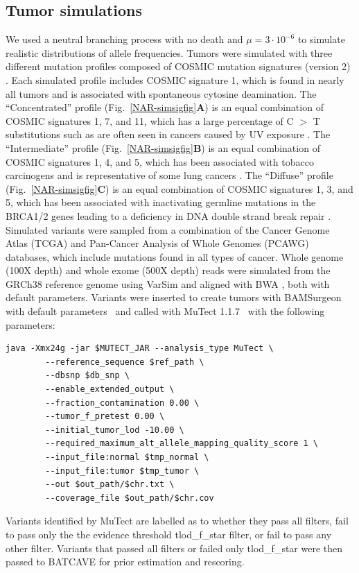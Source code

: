 \documentclass[a4,center,fleqn]{NAR}
\newcommand{\batcave}{BATCAVE }
\begin{document}
\subsection{Tumor simulations}
We used a neutral branching process with no death and $\mu=3\cdot10^{-6}$ to simulate realistic distributions of allele frequencies.
Tumors were simulated with three different mutation profiles composed of COSMIC mutation signatures (version 2) \cite{Cosmic_consortium}.
Each simulated profile includes COSMIC signature 1, which is found in nearly all tumors and is associated with spontaneous cytosine deamination.
The ``Concentrated'' profile (Fig.~\ref{NAR-simsigfig}\textbf{A}) is an equal combination of COSMIC signatures 1, 7, and 11, which has a large percentage of C $>$ T substitutions such as are often seen in cancers caused by UV exposure \cite{Alexandrov2013}.
The ``Intermediate'' profile (Fig.~\ref{NAR-simsigfig}\textbf{B}) is an equal combination of COSMIC signatures 1, 4, and 5, which has been associated with tobacco carcinogens and is representative of some lung cancers \cite{Alexandrov2013}.
The ``Diffuse'' profile (Fig.~\ref{NAR-simsigfig}\textbf{C}) is an equal combination of COSMIC signatures 1, 3, and 5, which has been associated with inactivating germline mutations in the BRCA1/2 genes leading to a deficiency in DNA double strand break repair \cite{Nik-Zainal2016}.
Simulated variants were sampled from a combination of the Cancer Genome Atlas (TCGA) and Pan-Cancer Analysis of Whole Genomes (PCAWG) databases, which include mutations found in all types of cancer.
Whole genome (100X depth) and whole exome (500X depth) reads were simulated from the GRCh38 reference genome using VarSim \cite{Mu2015} and aligned with BWA \cite{Li2009a}, both with default parameters.
Variants were inserted to create tumors with BAMSurgeon with default parameters~\citep{Ewing2015a} and called with MuTect 1.1.7~\cite{Cibulskis2013} with the following parameters:
\begin{scriptsize}
\begin{verbatim}
java -Xmx24g -jar $MUTECT_JAR --analysis_type MuTect \
        --reference_sequence $ref_path \
        --dbsnp $db_snp \
        --enable_extended_output \
        --fraction_contamination 0.00 \
        --tumor_f_pretest 0.00 \
        --initial_tumor_lod -10.00 \
        --required_maximum_alt_allele_mapping_quality_score 1 \
        --input_file:normal $tmp_normal \
        --input_file:tumor $tmp_tumor \
        --out $out_path/$chr.txt \
        --coverage_file $out_path/$chr.cov
\end{verbatim}
\end{scriptsize}
Variants identified by MuTect are labelled as to whether they pass all filters, fail to pass only the the evidence threshold \textrm{tlod\_f\_star} filter, or fail to pass any other filter. 
Variants that passed all filters or failed only \textrm{tlod\_f\_star} were then passed to \batcave for prior estimation and rescoring.
\end{document}
